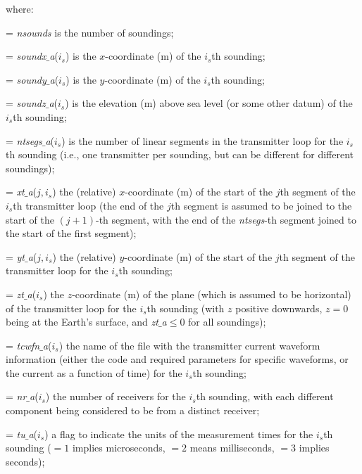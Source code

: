 \medskip\noindent
where:

\medskip
\hangindent=\parindent{}\noindent
{\sl nsounds} is the number of soundings;

\medskip
\hangindent=\parindent{}\noindent
{\sl soundx$\_$a}($i_s$) is the $x$-coordinate (m) of the $i_s$th sounding;

\medskip
\hangindent=\parindent{}\noindent
{\sl soundy$\_$a}($i_s$) is the $y$-coordinate (m) of the $i_s$th sounding;

\medskip
\hangindent=\parindent{}\noindent
{\sl soundz$\_$a}($i_s$) is the elevation (m) above sea level (or some other datum) of the $i_s$th sounding;

\medskip
\hangindent=\parindent{}\noindent
{\sl ntsegs$\_$a}($i_s$) is the number of linear segments in the transmitter loop for
the $i_s$th sounding (i.e., one transmitter per sounding, but can be different for
different soundings);

\medskip
\hangindent=\parindent{}\noindent
{\sl xt$\_$a}($j,i_s$) the (relative) $x$-coordinate (m) of the start of the $j$th
segment of the $i_s$th transmitter loop (the end of the $j$th segment is assumed
to be joined to the start of the $(j+1)$-th segment, with the end of the {\sl ntsegs}-th
segment joined to the start of the first segment);

\medskip
\hangindent=\parindent{}\noindent
{\sl yt$\_$a}($j,i_s$) the (relative) $y$-coordinate (m) of the start of the $j$th
segment of the transmitter loop for the $i_s$th sounding;

\medskip
\hangindent=\parindent{}\noindent
{\sl zt$\_$a}($i_s$) the $z$-coordinate (m) of the plane (which is assumed to be horizontal)
of the transmitter loop for the $i_s$th sounding (with $z$ positive downwards, $z=0$ being
at the Earth's surface, and {\sl zt$\_$a}$\le0$ for all soundings);

\medskip
\hangindent=\parindent{}\noindent
{\sl tcwfn$\_$a}($i_s$) the name of the file with the transmitter current waveform
information (either the code and required parameters for specific waveforms, or the
current as a function of time) for the $i_s$th sounding;

\medskip
\hangindent=\parindent{}\noindent
{\sl nr$\_$a}($i_s$) the number of receivers for the $i_s$th sounding, with each different
component being considered to be from a distinct receiver;

\medskip
\hangindent=\parindent{}\noindent
{\sl tu$\_$a}($i_s$) a flag to indicate the units of the measurement times for the
$i_s$th sounding ($=1$ implies microseconds, $=2$ means milliseconds, $=3$ implies seconds);

